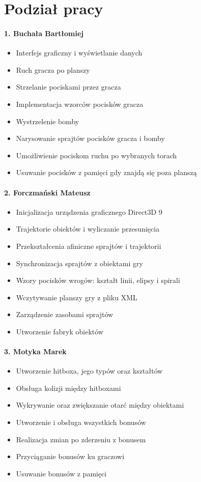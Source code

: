 \documentclass[a4paper,twoside]{article}
\begin{document}
	
	\newpage
	\part{Podział pracy}
		\subsection*{1. Buchała Bartłomiej}
			\begin{itemize}
				\item Interfejs graficzny i wyświetlanie danych
				\item Ruch gracza po planszy
				\item Strzelanie pociskami przez gracza
				\item Implementacja wzorców pocisków gracza
				\item Wystrzelenie bomby
				\item Narysowanie sprajtów pocisków gracza i bomby
				\item Umożliwienie pociskom ruchu po wybranych torach
				\item Usuwanie pocisków z pamięci gdy znajdą się poza planszą
			\end{itemize}
		
		\subsection*{2. Forczmański Mateusz}
			\begin{itemize}
				\item Inicjalizacja urządzenia graficznego Direct3D 9
				\item Trajektorie obiektów i wyliczanie przesunięcia
				\item Przekształcenia afiniczne sprajtów i trajektorii
				\item Synchronizacja sprajtów z obiektami gry
				\item Wzory pocisków wrogów: kształt linii, elipsy i spirali
				\item Wczytywanie planszy gry z pliku XML
				\item Zarządzenie zasobami sprajtów
				\item Utworzenie fabryk obiektów
			\end{itemize}
		
		\subsection*{3. Motyka Marek}
			\begin{itemize}
				\item Utworzenie hitboxa, jego typów oraz kształtów
				\item Obsługa kolizji między hitboxami
				\item Wykrywanie oraz zwiększanie otarć między obiektami
				\item Utworzenie i obsługa wszystkich bonusów
				\item Realizacja zmian po zderzeniu z bonusem
				\item Przyciąganie bonusów ku graczowi
				\item Usuwanie bonusów z pamięci
			\end{itemize}
			
\end{document}
